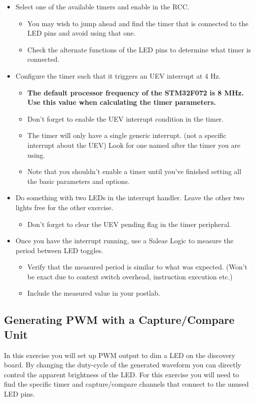 \documentclass[11pt,fleqn]{book} %
\begin{document}
\begin{itemize}
    \item Select one of the available timers and enable in the RCC.
    \begin{itemize}
        \item You may wish to jump ahead and find the timer that is connected to the LED pins and avoid using that one. 
        \item Check the alternate functions of the LED pins to determine what timer is connected.
    \end{itemize}
    \item Configure the timer such that it triggers an UEV interrupt at 4 Hz.
    \begin{itemize}
        \item \textbf{The default processor frequency of the STM32F072 is 8 MHz. Use this value when calculating the timer parameters.}
        \item Don't forget to enable the UEV interrupt condition in the timer. 
        \item The timer will only have a single generic interrupt. (not a specific interrupt about the UEV) Look for one named after the timer you are using. 
        \item Note that you shouldn't enable a timer until you've finished setting all the basic parameters and options. 
    \end{itemize}
    \item Do something with two LEDs in the interrupt handler. Leave the other two lights free for the other exercise. 
     \begin{itemize}
         \item Don't forget to clear the UEV pending flag in the timer peripheral. 
     \end{itemize}
     \item Once you have the interrupt running, use a Saleae Logic to measure the period between LED toggles.
     \begin{itemize}
         \item Verify that the measured period is similar to what was expected. (Won't be exact due to context switch overhead, instruction execution etc.)
         \item Include the measured value in your postlab.
     \end{itemize}
\end{itemize}


\subsection{Generating PWM with a Capture/Compare Unit}
In this exercise you will set up PWM output to dim a LED on the discovery board. By changing the duty-cycle of the generated waveform you can directly control the apparent brightness of the LED. For this exercise you will need to find the specific timer and capture/compare channels that connect to the unused LED pins. 
\end{document}
